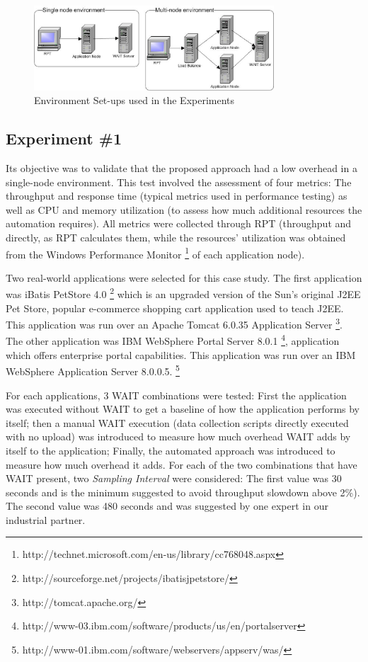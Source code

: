 \documentclass[runningheads,a4paper]{llncs}
\begin{document}
\begin{figure}[!h]
\centering
\includegraphics[totalheight=.25\textheight,width=0.8\textwidth]{Environments}
\caption{Environment Set-ups used in the Experiments}
\label{fig_env}
\end{figure}

\subsection{Experiment \#1}

Its objective was to validate that the proposed approach had a low overhead in
a single-node environment. This test involved the assessment of four metrics:
The throughput and response time (typical metrics used in performance testing) as well as CPU
and memory utilization (to assess how much additional resources the automation
requires). All metrics were collected through RPT (throughput and
directly, as RPT calculates them, while the resources' utilization was obtained
from the Windows Performance Monitor \footnote{http://technet.microsoft.com/en-us/library/cc768048.aspx} 
of each application node).

Two real-world applications were selected for this case study. The first
application was iBatis PetStore 4.0
\footnote{http://sourceforge.net/projects/ibatisjpetstore/} which is an 
upgraded version of the Sun's original J2EE Pet Store, popular e-commerce shopping 
cart application used to teach J2EE. This application was run over an Apache
Tomcat 6.0.35 Application Server \footnote{http://tomcat.apache.org/}. The
other application was IBM WebSphere Portal Server 8.0.1
\footnote{http://www-03.ibm.com/software/products/us/en/portalserver},
application which offers enterprise portal capabilities. This application was
run over an IBM WebSphere Application Server 8.0.0.5.
\footnote{http://www-01.ibm.com/software/webservers/appserv/was/}

For each applications, 3 WAIT combinations were tested: First the
application was executed without WAIT to get a baseline of how the
application performs by itself; then a manual WAIT execution (data collection
scripts directly executed with no upload) was introduced to measure how much
overhead WAIT adds by itself to the application; Finally, the automated approach was introduced to
measure how much overhead it adds. For each of the two combinations that have
WAIT present, two \emph{Sampling Interval} were considered: The first
value was 30 seconds and is the minimum suggested to avoid throughput slowdown
above 2\%). The second value was 480 seconds and was suggested by one expert in
our industrial partner.
\end{document}
